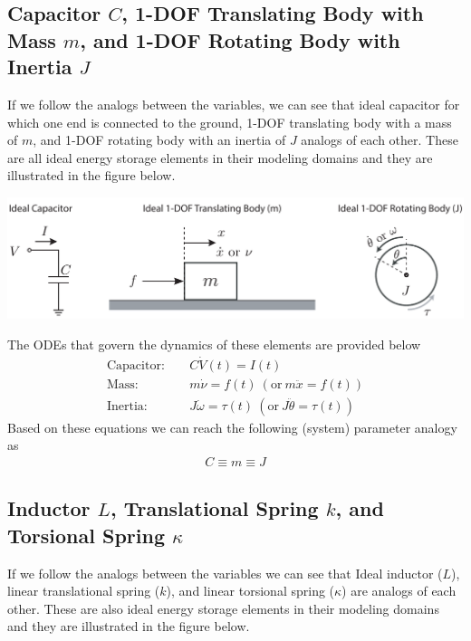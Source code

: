 \documentclass[twoside]{article}
\theoremstyle{definition}
\begin{document}
\subsection{Capacitor $C$, 1-DOF Translating Body with Mass
  $m$, and 1-DOF Rotating Body with Inertia $J$}

If we follow the analogs between the variables, we can see that ideal
capacitor for which one end is connected to the ground, 1-DOF translating body with a mass
of $m$, and 1-DOF rotating body with an inertia of  $J$ analogs of each other. 
These are all ideal energy storage elements in their modeling
domains and they are illustrated in the figure below. 

  \begin{minipage}[h]{0.95\linewidth}
    \begin{center}
      \includegraphics[width=1\textwidth]{cap}
    \end{center}
  \end{minipage}

The ODEs that govern the dynamics of these elements are provided below
%
\begin{align*}
\mathrm{Capacitor:}& \quad C \dot{V}(t) = I(t) \\
\mathrm{Mass:}& \quad  m \dot{\nu} = f(t) \ (\mathrm{or} \ m \ddot{x} =
                f(t) ) \\
\mathrm{Inertia:}& \quad J \dot{\omega} = \tau (t) \ (\mathrm{or} \ J \ddot{\theta} = \tau (t) )
\end{align*}
%
Based on these equations we can reach the following (system) parameter
analogy as
%
\begin{align*}
 C \equiv m \equiv J
\end{align*}
%

\subsection{Inductor $L$, Translational Spring $k$, and Torsional Spring $\kappa$}

If we follow the analogs between the variables we can see that Ideal
inductor ($L$), linear translational spring ($k$), and linear
torsional spring ($\kappa$) are analogs of each other. 
These are also ideal energy storage elements in their modeling
domains and they are illustrated in the figure below. 
\end{document}
